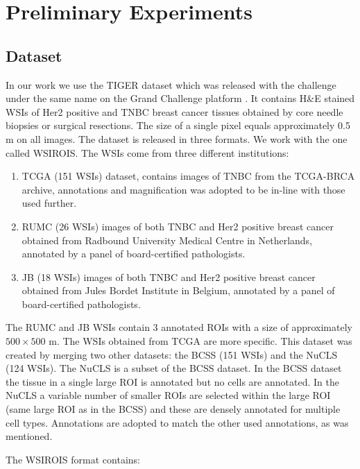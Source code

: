 \chapter{Preliminary Experiments}
\label{chap:prelim-exp}

\section{Dataset}
In our work we use the TIGER dataset which was released with the challenge under the same name on the Grand Challenge platform \cite{tiger_dataset}. It contains H\&E stained WSIs of Her2 positive and TNBC breast cancer tissues obtained by core needle biopsies or surgical resections. The size of a single pixel equals approximately 0.5 \textmu m on all images. The dataset is released in three formats. We work with the one called WSIROIS. The WSIs come from three different institutions:

\begin{enumerate}
    \item TCGA (151 WSIs) dataset, contains images of TNBC from the TCGA-BRCA archive, annotations and magnification was adopted to be in-line with those used further.
    \item RUMC (26 WSIs) images of both TNBC and Her2 positive breast cancer obtained from Radbound University Medical Centre in Netherlands, annotated by a panel of board-certified pathologists.
    \item JB (18 WSIs) images of both TNBC and Her2 positive breast cancer obtained from Jules Bordet Institute in Belgium, annotated by a panel of board-certified pathologists.
\end{enumerate}

The RUMC and JB WSIs contain 3 annotated ROIs with a size of approximately $500\!\times\!500$ \textmu m. The WSIs obtained from TCGA are more specific. This dataset was created by merging two other datasets: the BCSS (151 WSIs) and the NuCLS (124 WSIs). The NuCLS is a subset of the BCSS dataset. In the BCSS dataset the tissue in a single large ROI is annotated but no cells are annotated. In the NuCLS a variable number of smaller ROIs are selected within the large ROI (same large ROI as in the BCSS) and these are densely annotated for multiple cell types. Annotations are adopted to match the other used annotations, as was mentioned.

The WSIROIS format contains:

